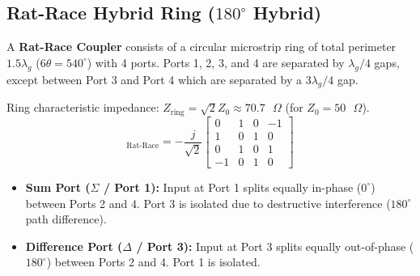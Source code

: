 \documentclass[12pt,a4paper]{article}
\begin{document}
\subsection{Rat-Race Hybrid Ring ($180^\circ$ Hybrid)}
A \textbf{Rat-Race Coupler} consists of a circular microstrip ring of total perimeter $1.5\lambda_g$ ($6\theta = 540^\circ$) with 4 ports. Ports 1, 2, 3, and 4 are separated by $\lambda_g/4$ gaps, except between Port 3 and Port 4 which are separated by a $3\lambda_g/4$ gap.

\begin{tcolorbox}[formulabox, title={Rat-Race Impedance \& Scattering Matrix}]
  Ring characteristic impedance: $Z_{\text{ring}} = \sqrt{2} Z_0 \approx 70.7\text{ }\Omega$ (for $Z_0 = 50\text{ }\Omega$).
  \begin{equation}
    [S]_{\text{Rat-Race}} = -\frac{j}{\sqrt{2}} \begin{bmatrix} 0 & 1 & 0 & -1 \\ 1 & 0 & 1 & 0 \\ 0 & 1 & 0 & 1 \\ -1 & 0 & 1 & 0 \end{bmatrix}
  \end{equation}
  \begin{itemize}[leftmargin=*, noitemsep]
    \item \textbf{Sum Port ($\Sigma$ / Port 1):} Input at Port 1 splits equally in-phase ($0^\circ$) between Ports 2 and 4. Port 3 is isolated due to destructive interference ($180^\circ$ path difference).
    \item \textbf{Difference Port ($\Delta$ / Port 3):} Input at Port 3 splits equally out-of-phase ($180^\circ$) between Ports 2 and 4. Port 1 is isolated.
  \end{itemize}
\end{tcolorbox}
\end{document}
